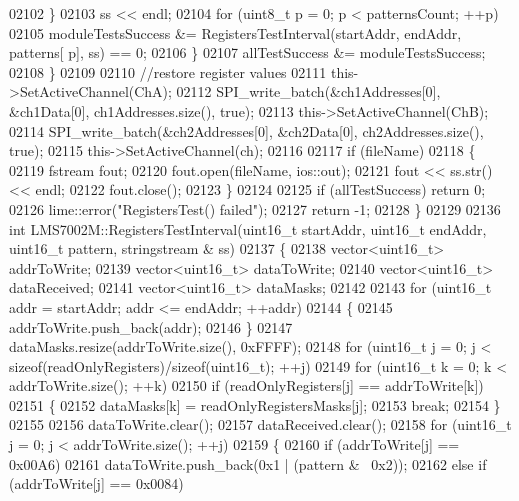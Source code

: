 \begin{DoxyCode}
{{{{{{{{{{{{{{{{{{{{{{{{{{{{{{{{{{{{{{{{{{{{{{{{{{{{{{{{{02102         \}
02103             ss << endl;
02104             \textcolor{keywordflow}{for} (uint8\_t p = 0; p < patternsCount; ++p)
02105                 moduleTestsSuccess &= RegistersTestInterval(startAddr, endAddr, patterns[
      p], ss) == 0;
02106         \}
02107         allTestSuccess &= moduleTestsSuccess;
02108     \}
02109 
02110     \textcolor{comment}{//restore register values}
02111     this->SetActiveChannel(ChA);
02112     SPI_write_batch(&ch1Addresses[0], &ch1Data[0], ch1Addresses.size(), \textcolor{keyword}{true});
02113     this->SetActiveChannel(ChB);
02114     SPI_write_batch(&ch2Addresses[0], &ch2Data[0], ch2Addresses.size(), \textcolor{keyword}{true});
02115     this->SetActiveChannel(ch);
02116 
02117     \textcolor{keywordflow}{if} (fileName)
02118     \{
02119         fstream fout;
02120         fout.open(fileName, ios::out);
02121         fout << ss.str() << endl;
02122         fout.close();
02123     \}
02124 
02125     \textcolor{keywordflow}{if} (allTestSuccess) \textcolor{keywordflow}{return} 0;
02126     lime::error(\textcolor{stringliteral}{"RegistersTest() failed"});
02127     \textcolor{keywordflow}{return} -1;
02128 \}
02129 
02136 \textcolor{keywordtype}{int} LMS7002M::RegistersTestInterval(uint16\_t startAddr, uint16\_t endAddr, uint16\_t pattern, stringstream &
      ss)
02137 \{
02138     vector<uint16\_t> addrToWrite;
02139     vector<uint16\_t> dataToWrite;
02140     vector<uint16\_t> dataReceived;
02141     vector<uint16\_t> dataMasks;
02142 
02143     \textcolor{keywordflow}{for} (uint16\_t addr = startAddr; addr <= endAddr; ++addr)
02144     \{
02145         addrToWrite.push\_back(addr);
02146     \}
02147     dataMasks.resize(addrToWrite.size(), 0xFFFF);
02148     \textcolor{keywordflow}{for} (uint16\_t j = 0; j < \textcolor{keyword}{sizeof}(readOnlyRegisters)/\textcolor{keyword}{sizeof}(uint16\_t); ++j)
02149         \textcolor{keywordflow}{for} (uint16\_t k = 0; k < addrToWrite.size(); ++k)
02150             \textcolor{keywordflow}{if} (readOnlyRegisters[j] == addrToWrite[k])
02151             \{
02152                 dataMasks[k] = readOnlyRegistersMasks[j];
02153                 \textcolor{keywordflow}{break};
02154             \}
02155 
02156     dataToWrite.clear();
02157     dataReceived.clear();
02158     \textcolor{keywordflow}{for} (uint16\_t j = 0; j < addrToWrite.size(); ++j)
02159     \{
02160         \textcolor{keywordflow}{if} (addrToWrite[j] == 0x00A6)
02161             dataToWrite.push\_back(0x1 | (pattern & ~0x2));
02162         \textcolor{keywordflow}{else} \textcolor{keywordflow}{if} (addrToWrite[j] == 0x0084)
}}}}}}}}}}}}}}}}}}}}}}}}}}}}}}}}}}}}}}}}}}}}}}}}}}}}}}}}}
\end{DoxyCode}
